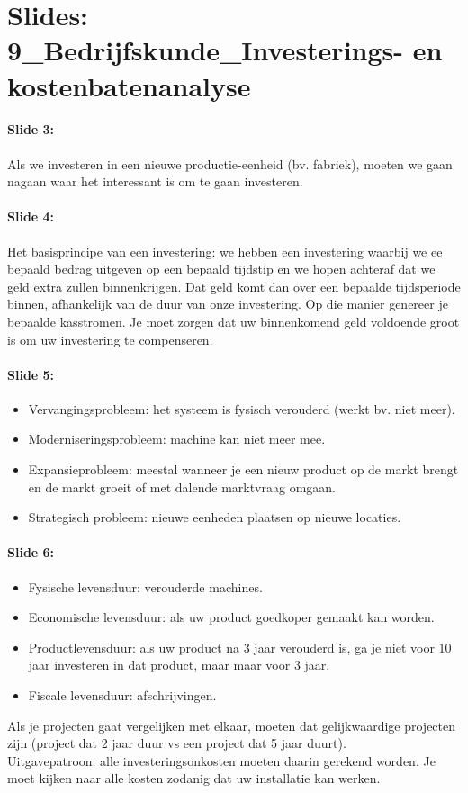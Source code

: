 \documentclass[10pt,a4paper]{report}
\begin{document}
\section{Slides: 9\_Bedrijfskunde\_Investerings- en kostenbatenanalyse}

\paragraph{Slide 3:} Als we investeren in een nieuwe productie-eenheid (bv. fabriek), moeten we gaan nagaan waar het interessant is om te gaan investeren. 

\paragraph{Slide 4:} Het basisprincipe van een investering: we hebben een investering waarbij we ee bepaald bedrag uitgeven op een bepaald tijdstip en we hopen achteraf dat we geld extra zullen binnenkrijgen. Dat geld komt dan over een bepaalde tijdsperiode binnen, afhankelijk van de duur van onze investering. Op die manier genereer je bepaalde kasstromen. Je moet zorgen dat uw binnenkomend geld voldoende groot is om uw investering te compenseren.

\paragraph{Slide 5:}
\begin{itemize} 
\item Vervangingsprobleem: het systeem is fysisch verouderd (werkt bv. niet meer). 
\item Moderniseringsprobleem: machine kan niet meer mee.
\item Expansieprobleem: meestal wanneer je een nieuw product op de markt brengt en de markt groeit of met dalende marktvraag omgaan.
\item Strategisch probleem: nieuwe eenheden plaatsen op nieuwe locaties.
\end{itemize}

\paragraph{Slide 6:}
\begin{itemize}
\item Fysische levensduur: verouderde machines.
\item Economische levensduur: als uw product goedkoper gemaakt kan worden.
\item Productlevensduur: als uw product na 3 jaar verouderd is, ga je niet voor 10 jaar investeren in dat product, maar maar voor 3 jaar.
\item Fiscale levensduur: afschrijvingen.
\end{itemize}
Als je projecten gaat vergelijken met elkaar, moeten dat gelijkwaardige projecten zijn (project dat 2 jaar duur vs een project dat 5 jaar duurt). \\
Uitgavepatroon: alle investeringsonkosten moeten daarin gerekend worden. Je moet kijken naar alle kosten zodanig dat uw installatie kan werken.
\end{document}
